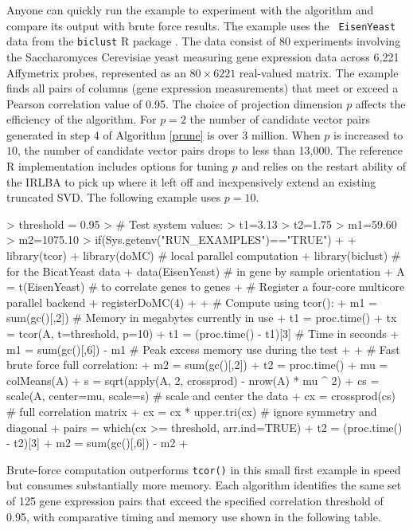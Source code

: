 \documentclass{article}
\let\proglang=\textsf
\numberwithin{algorithmctr}{section}
\begin{document}
Anyone can quickly run the example to experiment with the algorithm and
compare its output with brute force results. The example uses the {\tt
EisenYeast} data from the {\tt biclust} \proglang{R} package \cite{biclust}.
The data consist of 80 experiments involving the
Saccharomyces Cerevisiae yeast measuring gene expression data across 6,221
Affymetrix probes, represented as an $80\times 6221$ real-valued matrix.  The
example finds all pairs of columns (gene expression measurements) that meet or exceed a
Pearson correlation value of 0.95. The choice of projection dimension $p$ affects
the efficiency of the algorithm. For $p=2$ the number of candidate vector pairs
generated in step 4 of Algorithm \ref{prune} is over 3 million. When $p$ is increased
to $10$, the number of candidate vector pairs drops to less than 13,000.
The reference \proglang{R} implementation includes options for
tuning $p$ and relies on the restart ability of the IRLBA to pick up where it left off and
inexpensively extend an existing truncated SVD. The following example uses $p=10$.
\begin{small}
\begin{Schunk}
\begin{Sinput}
> threshold = 0.95
> # Test system values:
> t1=3.13
> t2=1.75
> m1=59.60
> m2=1075.10
> if(Sys.getenv("RUN_EXAMPLES")=="TRUE")
+ {
+ library(tcor)
+ library(doMC)     # local parallel computation
+ library(biclust)  # for the BicatYeast data
+ data(EisenYeast)  # in gene by sample orientation
+ A = t(EisenYeast) # to correlate genes to genes
+ # Register a four-core multicore parallel backend
+ registerDoMC(4)
+ 
+ # Compute using tcor():
+ m1  = sum(gc()[,2])  # Memory in megabytes currently in use
+ t1  = proc.time()
+ tx  = tcor(A, t=threshold, p=10)
+ t1  = (proc.time() - t1)[3] # Time in seconds
+ m1  = sum(gc()[,6]) - m1    # Peak excess memory use during the test
+ 
+ # Fast brute force full correlation:
+ m2  = sum(gc()[,2])
+ t2  = proc.time()
+ mu = colMeans(A)
+ s  = sqrt(apply(A, 2, crossprod) - nrow(A) * mu ^ 2)
+ cs = scale(A, center=mu, scale=s)  # scale and center the data
+ cx = crossprod(cs)                 # full correlation matrix
+ cx  = cx * upper.tri(cx)    # ignore symmetry and diagonal
+ pairs = which(cx >= threshold, arr.ind=TRUE)
+ t2  = (proc.time() - t2)[3]
+ m2  = sum(gc()[,6]) - m2
+ }
\end{Sinput}
\end{Schunk}
\end{small}
Brute-force computation outperforms {\tt tcor()} in this small first example in
speed but consumes substantially more memory.  Each algorithm identifies the
same set of 125 gene expression pairs that exceed the specified correlation
threshold of 0.95, with comparative timing and memory use shown in the
following table.
\end{document}

